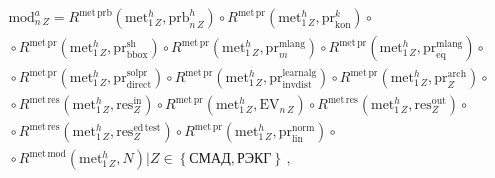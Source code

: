  \begin{multline}


 \mathrm{mod}^a_{n\,Z}=R^{\mathrm{met}\,\mathrm{prb}}\left( \mathrm{met}_{1\,Z}^h, \mathrm{prb}^h_{n\,Z}\right)\circ


R^{\mathrm{met\,pr}}\left( \mathrm{met}_{1\,Z}^h, \mathrm{pr}^k_{\mathrm{kon}}\right)\circ{} \\


{}\circ R^{\mathrm{met\,pr}}\left( \mathrm{met}^h_{1\,Z},


\mathrm{pr}^{\mathrm{sh}}_{\mathrm{bbox}}\right)\circ


R^{\mathrm{met\,pr}} \left( \mathrm{met}_{1\,Z}^h, \mathrm{pr}_m^{\mathrm{mlang}}\right)


\circ R^{\mathrm{met\,pr}}\left(


\mathrm{met}_{1\,Z}^h, \mathrm{pr}_{\mathrm{eq}}^{\mathrm{mlang}}\right) \circ {}\\


{}\circ


R^{\mathrm{met\,pr}}\left( \mathrm{met}_{1\,Z}^h,


\mathrm{pr}_{\mathrm{direct}}^{\mathrm{solpr}}\right)


 \circ R^{\mathrm{met\,pr}}\left( \mathrm{met}^h_{1\,Z},


 \mathrm{pr}^{\mathrm{learnalg}}_{\mathrm{invdist}}\right)\circ


R^{\mathrm{met\,pr}}\left(


\mathrm{met}_{1\,Z}^h, \mathrm{pr}_Z^{\mathrm{arch}}\right) \circ {}\\


{}\circ


R^{\mathrm{met\,res}} \left( \mathrm{met}_{1\,Z}^h,


\mathrm{res}_Z^{\mathrm{in}}\right)\circ


 R^{\mathrm{met\,pr}}\left( \mathrm{met}_{1\,Z}^h, \mathrm{EV}_{n\,Z}\right)\circ


R^{\mathrm{met\,res}}\left( \mathrm{met}^h_{1\,Z},


\mathrm{res}_Z^{\mathrm{out}}\right) \circ{}\\


{}\circ R^{\mathrm{met\,res}}\left(


\mathrm{met}_{1\,Z}^h, \mathrm{res}_Z^{\mathrm{ed\,test}}\right) \circ R^{\mathrm{met\,pr}}\left( \mathrm{met}^h_{1\,Z},\mathrm{pr}_{\mathrm{lin}}^{\mathrm{norm}}\right)


 \circ {}\\


 {}\circ R^{\mathrm{met\,mod}}\left(


\mathrm{met}^h_{1\,Z}, N\right) \vert Z\in \left\{ \mathrm{СМАД, РЭКГ}\right\}\,,


 \label{e2-kir}


 \end{multline}


